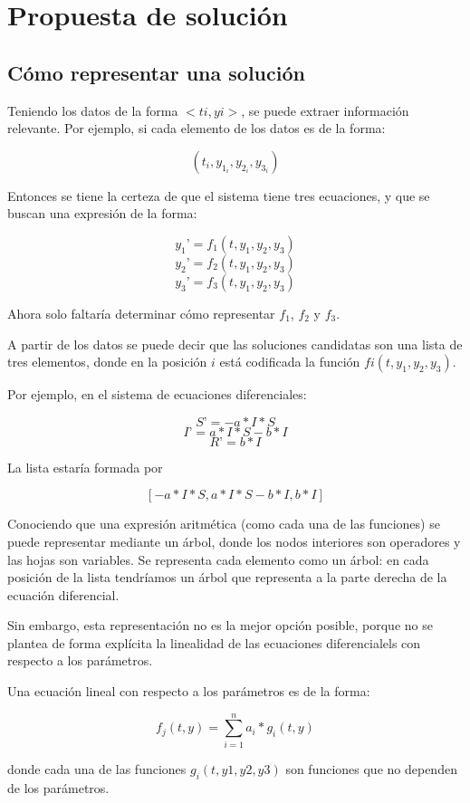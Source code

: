 \chapter{Propuesta de solución}\label{chapter:solution_proposal}

\section{Cómo representar una solución}

Teniendo los datos de la forma $<ti, yi>$, se puede extraer información relevante. Por ejemplo, si cada elemento de los datos es de la forma:

$$(t_i, y_{1_i}, y_{2_i}, y_{3_i})$$

Entonces se tiene la certeza de que el sistema tiene tres ecuaciones, y que se buscan una expresión de la forma:

$$y_1’ = f_1(t, y_1, y_2, y_3)$$
$$y_2’ = f_2(t, y_1, y_2, y_3)$$
$$y_3’ = f_3(t, y_1, y_2, y_3)$$

Ahora solo faltaría determinar cómo representar $f_1$, $f_2$ y $f_3$.

A partir de los datos se puede decir que las soluciones candidatas son una lista de tres elementos, donde en la posición $i$ está codificada la función $fi(t,y_1,y_2,y_3)$.

Por ejemplo, en el sistema de ecuaciones diferenciales:

$$S’ = - a*I*S$$
$$I’ = a*I*S - b*I $$
$$R’ = b*I$$

La lista estaría formada por

$$[-a*I*S, a*I*S - b*I, b*I]$$

Conociendo que una expresión aritmética (como cada una de las funciones) se puede representar mediante un árbol, donde los nodos interiores son operadores y las hojas son variables.  Se representa cada elemento como un árbol: en cada posición de la lista tendríamos un árbol que representa a la parte derecha de la ecuación diferencial.

Sin embargo, esta representación no es la mejor opción posible, porque no se plantea de forma explícita la linealidad de las ecuaciones diferencialels con respecto a los parámetros.

Una ecuación lineal con respecto a los parámetros es de la forma:

$$f_j(t,y) = \sum_{i=1}^{n} a_i * g_i(t, y)$$

donde cada una de las funciones $g_i(t,y1,y2,y3)$ son funciones que no dependen de los parámetros.

